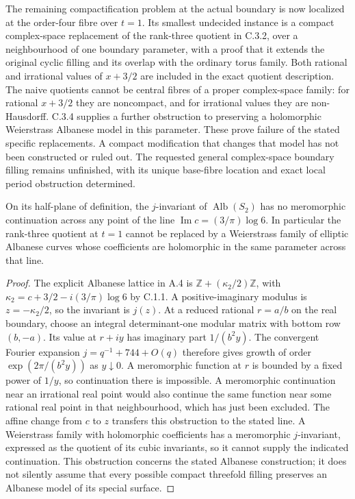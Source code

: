 \begin{remark}[C.3.3; Open]\label{st:C.3.3}
The remaining compactification problem at the actual boundary is now
localized at the order-four fibre over $t=1$. Its smallest undecided
instance is a compact complex-space replacement of the rank-three
quotient in C.3.2, over a neighbourhood of one boundary parameter,
with a proof that it extends the original cyclic filling and its overlap
with the ordinary torus family. Both rational and irrational values of
$x+3/2$ are included in the exact quotient description. The naive
quotients cannot be central fibres of a proper complex-space family:
for rational $x+3/2$ they are noncompact, and for irrational values
they are non-Hausdorff. C.3.4 supplies a further obstruction to preserving
a holomorphic Weierstrass Albanese model in this parameter.
These prove failure of the stated specific replacements. A compact
modification that changes that model has not been constructed or ruled
out. The requested general complex-space boundary filling remains
unfinished, with its unique base-fibre location and exact local period
obstruction determined.
\end{remark}

\begin{proposition}[C.3.4; Proved]\label{st:C.3.4}
On its half-plane of definition, the $j$-invariant of
$\operatorname{Alb}(S_2)$ has no meromorphic continuation across any
point of the line
$\operatorname{Im}c=(3/\pi)\log6$. In particular the rank-three quotient
at $t=1$ cannot be replaced by a Weierstrass family of elliptic Albanese
curves whose coefficients are holomorphic in the same parameter across
that line.
\end{proposition}
\begin{proof}
The explicit Albanese lattice in A.4 is
$\mathbb Z+(\kappa_2/2)\mathbb Z$, with
$\kappa_2=c+3/2-i(3/\pi)\log6$ by C.1.1. A positive-imaginary modulus is
$z=-\kappa_2/2$, so the invariant is $j(z)$. At a reduced rational
$r=a/b$ on the real boundary, choose an integral determinant-one modular
matrix with bottom row $(b,-a)$. Its value at $r+iy$ has imaginary part
$1/(b^2y)$. The convergent Fourier expansion $j=q^{-1}+744+O(q)$ therefore
gives growth of order $\exp(2\pi/(b^2y))$ as $y\downarrow0$.
A meromorphic function at $r$ is bounded by a fixed power of $1/y$,
so continuation there is impossible. A meromorphic continuation near an
irrational real point would also continue the same function near some
rational real point in that neighbourhood, which has just been excluded.
The affine change from $c$ to $z$ transfers this obstruction to the
stated line. A Weierstrass family with holomorphic coefficients has a
meromorphic $j$-invariant, expressed as the quotient of its cubic
invariants, so it cannot supply the indicated continuation. This
obstruction concerns the stated Albanese construction; it does not
silently assume that every possible compact threefold filling preserves
an Albanese model of its special surface.
\end{proof}

